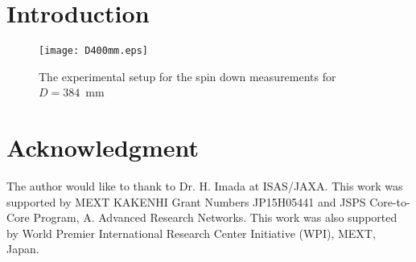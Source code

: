 \documentclass[a4paper]{jpconf}
\begin{document}
\section*{Introduction}

\begin{figure}[bh]
   \centering
   \texttt{[image: D400mm.eps]}
   \caption{The experimental setup for the spin down measurements for $D=384$~mm}
   \label{fig:d400}
\end{figure}

\section*{Acknowledgment}
The author would like to thank to Dr. H. Imada at ISAS/JAXA.
This work was supported by MEXT KAKENHI Grant Numbers JP15H05441 and JSPS Core-to-Core Program, A. Advanced Research Networks.
This work was also supported by World Premier International Research Center Initiative (WPI), MEXT, Japan.
\end{document}
